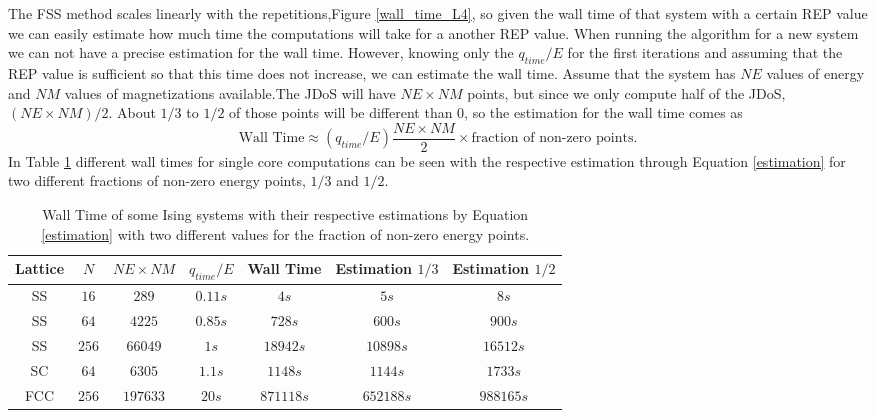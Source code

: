 	The FSS method scales linearly with the repetitions,Figure \ref{wall_time_L4}, so given the wall time of that system with a certain REP value we can easily estimate how much time the computations will take for a another REP value.
When running the algorithm for a new system we can not have a precise estimation for the wall time. However, knowing only the $q_{time}/E$ for the first iterations and assuming that the REP value is sufficient so that this time does not increase, we can estimate the wall time. Assume that the system has $NE$ values of energy and $NM$ values of magnetizations available.The JDoS will have $NE \times NM$ points, but since we only compute half of the JDoS, $( NE \times NM ) / 2$. About $1/3$ to $1/2$ of those points will be different than 0, so the estimation for the wall time comes as 
\begin{equation}\label{estimation}
	\text{Wall Time} \approx (q_{time}/E) \frac{NE \times NM}{2} \times \text{fraction of non-zero points} .
\end{equation}
In Table \ref{wall_time_table} different wall times for single core computations can be seen with the respective estimation through Equation \ref{estimation} for two different fractions of non-zero energy points, $1/3$ and $1/2$. 

\begin{table}[h]
\centering
\caption{Wall Time of some Ising systems with their respective estimations by Equation \ref{estimation} with two different values for the fraction of non-zero energy points.} 
\begin{tabular}{c|c|c|c|c|c|c}
Lattice & $N$   & $NE \times NM$ & $q_{time}/E$ & Wall Time & Estimation $1/3$ & Estimation $1/2$ \\ \hline
SS      & $16$  & $289$                         & $0.11s $        & $4s$        &$ 5s$                  & $8s$                  \\
SS      & $64$  & $4225$                        & $0.85s$         & $728s$      & $600s $               & $900s    $ \\
SS      & $256$ & $66049$                       & $1s$            & $18942s$    & $10898s $             & $16512s  $ \\
SC      & $64$  & $6305$                        & $1.1s $         & $1148s$     & $1144s$              & $1733s $           \\
FCC     & $256$ & $197633$                      & $20s$           &$ 871118s$   & $652188s$      & $988165s$            
\end{tabular}
\label{wall_time_table}
\end{table}


